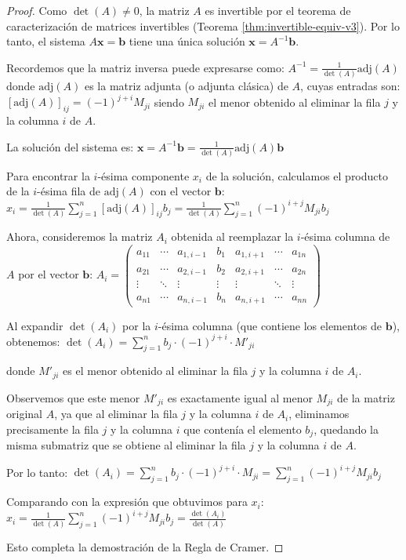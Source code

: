 \begin{proof}
Como $\det(A) \neq 0$, la matriz $A$ es invertible por el teorema de caracterización de matrices invertibles (Teorema \ref{thm:invertible-equiv-v3}). Por lo tanto, el sistema $A\mathbf{x} = \mathbf{b}$ tiene una única solución $\mathbf{x} = A^{-1}\mathbf{b}$.

Recordemos que la matriz inversa puede expresarse como:
$A^{-1} = \frac{1}{\det(A)}\text{adj}(A)$
donde $\text{adj}(A)$ es la matriz adjunta (o adjunta clásica) de $A$, cuyas entradas son:
$[\text{adj}(A)]_{ij} = (-1)^{j+i}M_{ji}$
siendo $M_{ji}$ el menor obtenido al eliminar la fila $j$ y la columna $i$ de $A$.

La solución del sistema es:
$\mathbf{x} = A^{-1}\mathbf{b} = \frac{1}{\det(A)}\text{adj}(A)\mathbf{b}$

Para encontrar la $i$-ésima componente $x_i$ de la solución, calculamos el producto de la $i$-ésima fila de $\text{adj}(A)$ con el vector $\mathbf{b}$:
$x_i = \frac{1}{\det(A)}\sum_{j=1}^{n} [\text{adj}(A)]_{ij}b_j = \frac{1}{\det(A)}\sum_{j=1}^{n} (-1)^{i+j}M_{ji}b_j$

Ahora, consideremos la matriz $A_i$ obtenida al reemplazar la $i$-ésima columna de $A$ por el vector $\mathbf{b}$:
$A_i = \begin{pmatrix}
a_{11} & \cdots & a_{1,i-1} & b_1 & a_{1,i+1} & \cdots & a_{1n} \\
a_{21} & \cdots & a_{2,i-1} & b_2 & a_{2,i+1} & \cdots & a_{2n} \\
\vdots & \ddots & \vdots & \vdots & \vdots & \ddots & \vdots \\
a_{n1} & \cdots & a_{n,i-1} & b_n & a_{n,i+1} & \cdots & a_{nn}
\end{pmatrix}$

Al expandir $\det(A_i)$ por la $i$-ésima columna (que contiene los elementos de $\mathbf{b}$), obtenemos:
$\det(A_i) = \sum_{j=1}^{n} b_j \cdot (-1)^{j+i} \cdot M'_{ji}$

donde $M'_{ji}$ es el menor obtenido al eliminar la fila $j$ y la columna $i$ de $A_i$. 

Observemos que este menor $M'_{ji}$ es exactamente igual al menor $M_{ji}$ de la matriz original $A$, ya que al eliminar la fila $j$ y la columna $i$ de $A_i$, eliminamos precisamente la fila $j$ y la columna $i$ que contenía el elemento $b_j$, quedando la misma submatriz que se obtiene al eliminar la fila $j$ y la columna $i$ de $A$.

Por lo tanto:
$\det(A_i) = \sum_{j=1}^{n} b_j \cdot (-1)^{j+i} \cdot M_{ji} = \sum_{j=1}^{n} (-1)^{i+j}M_{ji}b_j$

Comparando con la expresión que obtuvimos para $x_i$:
$x_i = \frac{1}{\det(A)}\sum_{j=1}^{n} (-1)^{i+j}M_{ji}b_j = \frac{\det(A_i)}{\det(A)}$

Esto completa la demostración de la Regla de Cramer.
\end{proof}

